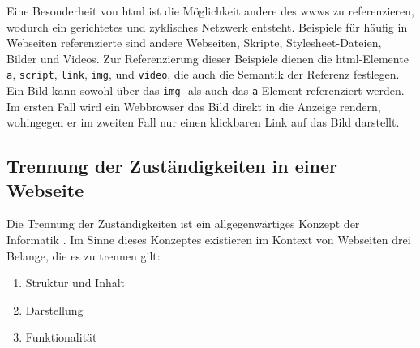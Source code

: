             Eine Besonderheit von \gls{html} ist die Möglichkeit
            andere {\resources} des \glspl{www} zu referenzieren,
            wodurch ein gerichtetes und zyklisches Netzwerk entsteht.
            Beispiele für häufig in Webseiten referenzierte {\resources}
            sind andere Webseiten, Skripte, Stylesheet-Dateien, Bilder und Videos.
            Zur Referenzierung dieser Beispiele dienen die \gls{html}-Elemente
            \texttt{a}, \texttt{script}, \texttt{link}, \texttt{img}, und \texttt{video},
            die auch die Semantik der Referenz festlegen.
            Ein Bild kann sowohl über das \texttt{img}-
            als auch das \texttt{a}-Element referenziert werden.
            Im ersten Fall wird ein Webbrowser das Bild direkt in die Anzeige rendern,
            wohingegen er im zweiten Fall nur einen klickbaren Link auf das Bild darstellt.

        \subsection{Trennung der Zuständigkeiten in einer Webseite}
            Die Trennung der Zuständigkeiten
            ist ein allgegenwärtiges Konzept der Informatik \cite{huersch:SeparationOfConcerns}.
            Im Sinne dieses Konzeptes existieren im Kontext von Webseiten
            drei Belange, die es zu trennen gilt:

            \begin{enumerate}
                \item Struktur und Inhalt
                \item Darstellung
                \item Funktionalität
            \end{enumerate}

